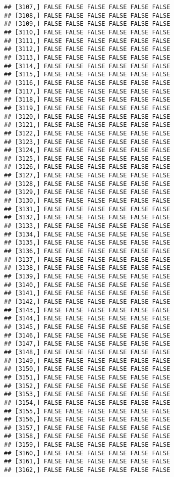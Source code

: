 \documentclass[
]{article}
\begin{document}
\begin{verbatim}
## [3107,] FALSE FALSE FALSE FALSE FALSE FALSE
## [3108,] FALSE FALSE FALSE FALSE FALSE FALSE
## [3109,] FALSE FALSE FALSE FALSE FALSE FALSE
## [3110,] FALSE FALSE FALSE FALSE FALSE FALSE
## [3111,] FALSE FALSE FALSE FALSE FALSE FALSE
## [3112,] FALSE FALSE FALSE FALSE FALSE FALSE
## [3113,] FALSE FALSE FALSE FALSE FALSE FALSE
## [3114,] FALSE FALSE FALSE FALSE FALSE FALSE
## [3115,] FALSE FALSE FALSE FALSE FALSE FALSE
## [3116,] FALSE FALSE FALSE FALSE FALSE FALSE
## [3117,] FALSE FALSE FALSE FALSE FALSE FALSE
## [3118,] FALSE FALSE FALSE FALSE FALSE FALSE
## [3119,] FALSE FALSE FALSE FALSE FALSE FALSE
## [3120,] FALSE FALSE FALSE FALSE FALSE FALSE
## [3121,] FALSE FALSE FALSE FALSE FALSE FALSE
## [3122,] FALSE FALSE FALSE FALSE FALSE FALSE
## [3123,] FALSE FALSE FALSE FALSE FALSE FALSE
## [3124,] FALSE FALSE FALSE FALSE FALSE FALSE
## [3125,] FALSE FALSE FALSE FALSE FALSE FALSE
## [3126,] FALSE FALSE FALSE FALSE FALSE FALSE
## [3127,] FALSE FALSE FALSE FALSE FALSE FALSE
## [3128,] FALSE FALSE FALSE FALSE FALSE FALSE
## [3129,] FALSE FALSE FALSE FALSE FALSE FALSE
## [3130,] FALSE FALSE FALSE FALSE FALSE FALSE
## [3131,] FALSE FALSE FALSE FALSE FALSE FALSE
## [3132,] FALSE FALSE FALSE FALSE FALSE FALSE
## [3133,] FALSE FALSE FALSE FALSE FALSE FALSE
## [3134,] FALSE FALSE FALSE FALSE FALSE FALSE
## [3135,] FALSE FALSE FALSE FALSE FALSE FALSE
## [3136,] FALSE FALSE FALSE FALSE FALSE FALSE
## [3137,] FALSE FALSE FALSE FALSE FALSE FALSE
## [3138,] FALSE FALSE FALSE FALSE FALSE FALSE
## [3139,] FALSE FALSE FALSE FALSE FALSE FALSE
## [3140,] FALSE FALSE FALSE FALSE FALSE FALSE
## [3141,] FALSE FALSE FALSE FALSE FALSE FALSE
## [3142,] FALSE FALSE FALSE FALSE FALSE FALSE
## [3143,] FALSE FALSE FALSE FALSE FALSE FALSE
## [3144,] FALSE FALSE FALSE FALSE FALSE FALSE
## [3145,] FALSE FALSE FALSE FALSE FALSE FALSE
## [3146,] FALSE FALSE FALSE FALSE FALSE FALSE
## [3147,] FALSE FALSE FALSE FALSE FALSE FALSE
## [3148,] FALSE FALSE FALSE FALSE FALSE FALSE
## [3149,] FALSE FALSE FALSE FALSE FALSE FALSE
## [3150,] FALSE FALSE FALSE FALSE FALSE FALSE
## [3151,] FALSE FALSE FALSE FALSE FALSE FALSE
## [3152,] FALSE FALSE FALSE FALSE FALSE FALSE
## [3153,] FALSE FALSE FALSE FALSE FALSE FALSE
## [3154,] FALSE FALSE FALSE FALSE FALSE FALSE
## [3155,] FALSE FALSE FALSE FALSE FALSE FALSE
## [3156,] FALSE FALSE FALSE FALSE FALSE FALSE
## [3157,] FALSE FALSE FALSE FALSE FALSE FALSE
## [3158,] FALSE FALSE FALSE FALSE FALSE FALSE
## [3159,] FALSE FALSE FALSE FALSE FALSE FALSE
## [3160,] FALSE FALSE FALSE FALSE FALSE FALSE
## [3161,] FALSE FALSE FALSE FALSE FALSE FALSE
## [3162,] FALSE FALSE FALSE FALSE FALSE FALSE

\end{verbatim}
\end{document}
